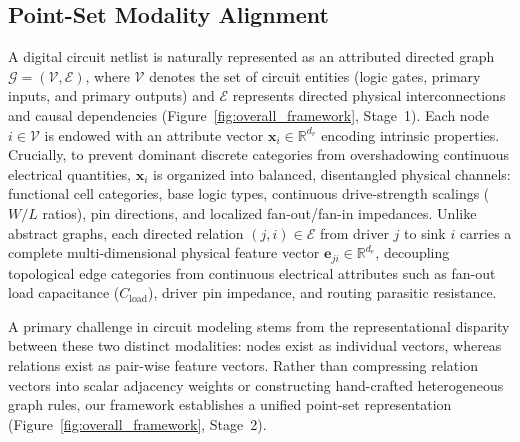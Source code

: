 \subsection{Point-Set Modality Alignment}
\label{sec:method_alignment}

A digital circuit netlist is naturally represented as an attributed directed graph $\mathcal{G} = (\mathcal{V}, \mathcal{E})$, where $\mathcal{V}$ denotes the set of circuit entities (logic gates, primary inputs, and primary outputs) and $\mathcal{E}$ represents directed physical interconnections and causal dependencies (Figure~\ref{fig:overall_framework}, Stage~1). Each node $i \in \mathcal{V}$ is endowed with an attribute vector $\mathbf{x}_i \in \mathbb{R}^{d_v}$ encoding intrinsic properties. Crucially, to prevent dominant discrete categories from overshadowing continuous electrical quantities, $\mathbf{x}_i$ is organized into balanced, disentangled physical channels: functional cell categories, base logic types, continuous drive-strength scalings ($W/L$ ratios), pin directions, and localized fan-out/fan-in impedances. Unlike abstract graphs, each directed relation $(j, i) \in \mathcal{E}$ from driver $j$ to sink $i$ carries a complete multi-dimensional physical feature vector $\mathbf{e}_{ji} \in \mathbb{R}^{d_e}$, decoupling topological edge categories from continuous electrical attributes such as fan-out load capacitance ($C_{\text{load}}$), driver pin impedance, and routing parasitic resistance.

A primary challenge in circuit modeling stems from the representational disparity between these two distinct modalities: nodes exist as individual vectors, whereas relations exist as pair-wise feature vectors. Rather than compressing relation vectors into scalar adjacency weights or constructing hand-crafted heterogeneous graph rules, our framework establishes a unified point-set representation (Figure~\ref{fig:overall_framework}, Stage~2).


